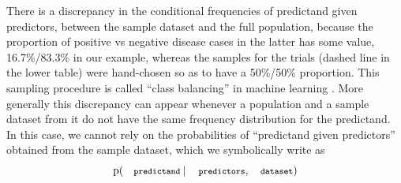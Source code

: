 \documentclass[utf8]{FrontiersinHarvard} %
\newcommand*{\wrench}{{\fontencoding{U}\fontfamily{fontawesomethree}\selectfont\symbol{114}}}
\newcommand{\mynotew}[1]{{\color{notecolour}\wrench\ #1}}
\newcommand*{\p}{\mathrm{p}}%
\renewcommand*{\|}[1][]{\nonscript\:#1\vert\nonscript\:\mathopen{}}
\newcommand*{\predictors}{\texttt{\footnotesize predictors}}
\newcommand*{\predictand}{\texttt{\footnotesize predictand}}
\newcommand*{\dataset}{\texttt{\footnotesize dataset}}
\begin{document}
There is a discrepancy in the conditional frequencies of predictand given predictors, between the sample dataset and the full population, because the proportion of positive vs negative disease cases in the latter has some value, 16.7\%/83.3\% in our example, whereas the samples for the trials (dashed line in the lower table) were hand-chosen so as to have a 50\%/50\% proportion. This sampling procedure is called \enquote{class balancing} in machine learning \citep{provost2000,drummondetal2005,weissetal2003}. More generally this discrepancy can appear whenever a population and a sample dataset from it do not have the same frequency distribution for the predictand. In this case, we cannot rely on the probabilities of \enquote{predictand given predictors} obtained from the sample dataset, which we symbolically write as
\begin{equation}
  \p(\predictand \| \predictors, \dataset)
\end{equation}

\end{document}
